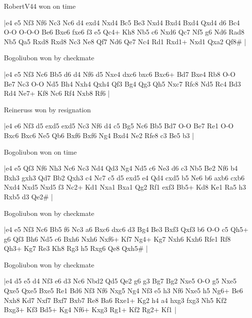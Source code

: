 \showboard

RobertV44 won on time

\makegametitle
|e4 e5 Nf3 Nf6 Nc3 Nc6 d4 exd4 Nxd4 Bc5 Be3 Nxd4 Bxd4 Bxd4 Qxd4 d6 Bc4 O-O O-O-O Be6 Bxe6 fxe6 f3 e5 Qc4+ Kh8 Nb5 c6 Nxd6 Qc7 Nf5 g6 Nd6 Rad8 Nb5 Qa5 Rxd8 Rxd8 Nc3 Ne8 Qf7 Nd6 Qe7 Nc4 Rd1 Rxd1+ Nxd1 Qxa2 Qf8\#  |

\showboard

Bogoliubon won by checkmate

\makegametitle
|e4 e5 Nf3 Nc6 Bb5 d6 d4 Nf6 d5 Nxe4 dxc6 bxc6 Bxc6+ Bd7 Bxe4 Rb8 O-O Be7 Nc3 O-O Nd5 Bh4 Nxh4 Qxh4 Qf3 Bg4 Qg3 Qh5 Nxc7 Rfc8 Nd5 Rc4 Bd3 Rd4 Ne7+ Kf8 Nc6 Rf4 Nxb8 Rf6  |

\showboard

Reineruss won by resignation

\makegametitle
|e4 e6 Nf3 d5 exd5 exd5 Nc3 Nf6 d4 c5 Bg5 Nc6 Bb5 Bd7 O-O Be7 Re1 O-O Bxc6 Bxc6 Ne5 Qb6 Bxf6 Bxf6 Ng4 Bxd4 Ne2 Rfe8 c3 Be5 b3  |

\showboard

Bogoliubon won on time

\makegametitle
|e4 e5 Qf3 Nf6 Nh3 Nc6 Nc3 Nd4 Qd3 Ng4 Nd5 c6 Ne3 d6 c3 Nb5 Be2 Nf6 b4 Bxh3 gxh3 Qd7 Bb2 Qxh3 c4 Nc7 c5 d5 exd5 e4 Qd4 cxd5 b5 Ne6 b6 axb6 cxb6 Nxd4 Nxd5 Nxd5 f3 Nc2+ Kd1 Nxa1 Bxa1 Qg2 Rf1 exf3 Bb5+ Kd8 Ke1 Ra5 h3 Rxb5 d3 Qe2\#  |

\showboard

Bogoliubon won by checkmate

\makegametitle
|e4 e5 Nf3 Nc6 Bb5 f6 Nc3 a6 Bxc6 dxc6 d3 Bg4 Be3 Bxf3 Qxf3 b6 O-O c5 Qh5+ g6 Qf3 Bh6 Nd5 c6 Bxh6 Nxh6 Nxf6+ Kf7 Ng4+ Kg7 Nxh6 Kxh6 Rfe1 Rf8 Qh3+ Kg7 Re3 Kh8 Rg3 h5 Rxg6 Qe8 Qxh5\#  |

\showboard

Bogoliubon won by checkmate

\makegametitle
|e4 d5 e5 d4 Nf3 e6 d3 Nc6 Nbd2 Qd5 Qe2 g6 g3 Bg7 Bg2 Nxe5 O-O g5 Nxe5 Qxe5 Qxe5 Bxe5 Re1 Bd6 Nf3 Nf6 Nxg5 Ng4 Nf3 e5 h3 Nf6 Nxe5 h5 Ng6+ Be6 Nxh8 Kd7 Nxf7 Bxf7 Bxb7 Re8 Ba6 Rxe1+ Kg2 h4 a4 hxg3 fxg3 Nh5 Kf2 Bxg3+ Kf3 Bd5+ Kg4 Nf6+ Kxg3 Rg1+ Kf2 Rg2+ Kf1  |

